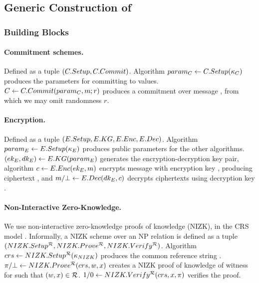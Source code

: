 \subsection{Generic Construction of \GSAC}
\label{ssec:generic-gsac}

\subsubsection{Building Blocks}
\label{sssec:generic-gsac-bblocks}


\paragraph{Commitment schemes.} %
Defined as a tuple $(C.Setup,C.Commit)$. Algorithm $param_C \gets
C.Setup(\kappa_{C})$ produces the parameters for committing to values. $C
\gets C.Commit(param_C, m; r)$ produces a commitment \Ccom over message \msg,
from which we may omit randomness $r$. 

\paragraph{Encryption.} %
Defined as a tuple $(E.Setup,E.KG,E.Enc,E.Dec)$. Algorithm $param_{E} \gets
E.Setup(\kappa_{E})$ produces public parameters for the other algorithms.
$(ek_{E},dk_{E}) \gets E.KG(param_{E})$ generates the encryption-decryption key
pair, algorithm $c \gets E.Enc(ek_{E},m)$ encrypts message \msg with
encryption key \Eek, producing ciphertext \Ec, and $m/\bot \gets E.Dec(dk_{E},
c)$ decrypts ciphertexts using decryption key \Edk. 

\paragraph{Non-Interactive Zero-Knowledge.} %
We use non-interactive zero-knowledge proofs of knowledge (NIZK), in the CRS
model \needcite. Informally, a NIZK scheme over an NP relation \NIZKRel is
defined as a tuple $(NIZK.Setup^\mathcal{R},NIZK.Prove^\mathcal{R},
NIZK.Verify^\mathcal{R})$. Algorithm $crs \gets NIZK.Setup^\mathcal{R}
(\kappa_{NIZK})$ produces the common reference string \NIZKcrs. $\pi/\bot
\gets NIZK.Prove^\mathcal{R}(crs,w,x)$ creates a NIZK proof of
knowledge of witness \NIZKw for \NIZKx such that $(w,x) \in \mathcal{R}$.
$1/0 \gets NIZK.Verify^\mathcal{R}(crs,x,\pi)$ verifies the proof.

